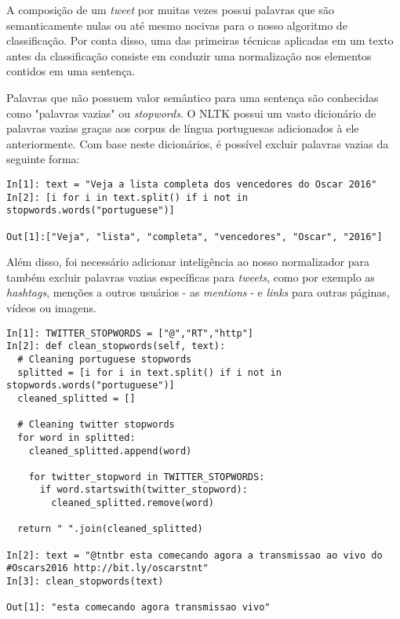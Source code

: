 A composição de um \textit{tweet} por muitas vezes possui palavras que são semanticamente nulas ou até mesmo nocivas para o nosso algoritmo de classificação. Por conta disso, uma das primeiras técnicas aplicadas em um texto antes da classificação consiste em conduzir uma normalização nos elementos contidos em uma sentença.

Palavras que não possuem valor semântico para uma sentença são conhecidas como "palavras vazias" ou \textit{stopwords}. O NLTK possui um vasto dicionário de palavras vazias graças aos corpus de língua portuguesas adicionados à ele anteriormente. Com base neste dicionários, é possível excluir palavras vazias da seguinte forma:

\begin{lstlisting}[style=python, frame=single]
In[1]: text = "Veja a lista completa dos vencedores do Oscar 2016"
In[2]: [i for i in text.split() if i not in stopwords.words("portuguese")]

Out[1]:["Veja", "lista", "completa", "vencedores", "Oscar", "2016"]
\end{lstlisting}

Além disso, foi necessário adicionar inteligência ao nosso normalizador para também excluir palavras vazias específicas para \textit{tweets}, como por exemplo as \textit{hashtags}, menções a outros usuários - as \textit{mentions} - e \textit{links} para outras páginas, vídeos ou imagens.

\begin{lstlisting}[style=python, frame=single]
In[1]: TWITTER_STOPWORDS = ["@","RT","http"]
In[2]: def clean_stopwords(self, text):
  # Cleaning portuguese stopwords
  splitted = [i for i in text.split() if i not in stopwords.words("portuguese")]
  cleaned_splitted = []

  # Cleaning twitter stopwords
  for word in splitted:
    cleaned_splitted.append(word)

    for twitter_stopword in TWITTER_STOPWORDS:
      if word.startswith(twitter_stopword):
        cleaned_splitted.remove(word)

  return " ".join(cleaned_splitted)

In[2]: text = "@tntbr esta comecando agora a transmissao ao vivo do #Oscars2016 http://bit.ly/oscarstnt"
In[3]: clean_stopwords(text)

Out[1]: "esta comecando agora transmissao vivo"

\end{lstlisting}



